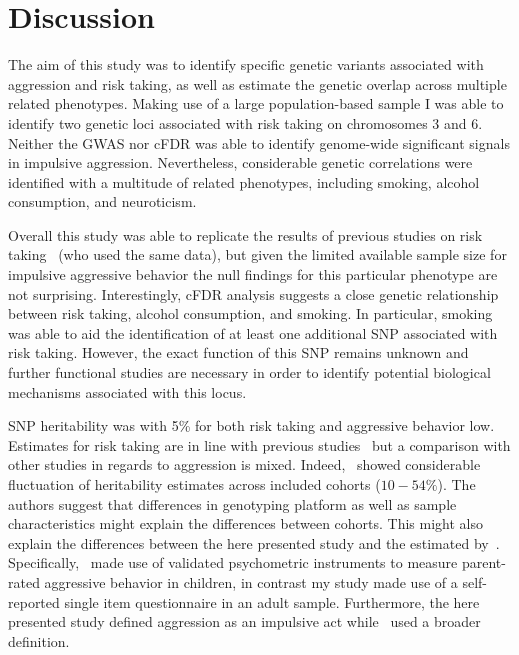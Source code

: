\section{Discussion}
\label{sec:ukb_assc_discussion}

The aim of this study was to identify specific genetic variants associated with aggression and risk taking,
as well as estimate the genetic overlap across multiple related phenotypes.
Making use of a large population-based sample I was able to identify two genetic loci associated with risk taking on chromosomes 3 and 6.
Neither the GWAS nor cFDR was able to identify genome-wide significant signals in impulsive aggression.
Nevertheless, considerable genetic correlations were identified with a multitude of related phenotypes, including smoking, alcohol consumption, and neuroticism.

Overall this study was able to replicate the results of previous studies on risk taking~\cite{Day2016} (who used the same data), but given the limited available sample size for impulsive aggressive behavior the null findings for this particular phenotype are not surprising.
Interestingly, cFDR analysis suggests a close genetic relationship between risk taking, alcohol consumption, and smoking.
In particular, smoking was able to aid the identification of at least one additional SNP associated with risk taking.
However, the exact function of this SNP remains unknown and further functional studies are necessary in order to identify potential biological mechanisms associated with this locus.

SNP heritability was with 5\% for both risk taking and aggressive behavior low.
Estimates for risk taking are in line with previous studies~\cite{Day2016} but a comparison with other studies in regards to aggression is mixed.
Indeed,~\citet{Pappa2016a} showed considerable fluctuation of heritability estimates across included cohorts ($10-54\%$). 
The authors suggest that differences in genotyping platform as well as sample characteristics might explain the differences between cohorts.
This might also explain the differences between the here presented study and the estimated by~\citet{Pappa2016a}.
Specifically,~\citet{Pappa2016a} made use of validated psychometric instruments to measure parent-rated aggressive behavior in children, in contrast my study made use of a self-reported single item questionnaire in an adult sample.
Furthermore, the here presented study defined aggression as an impulsive act while~\citet{Pappa2016a} used a broader definition.

